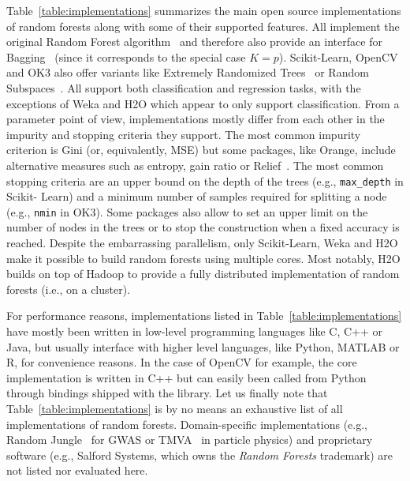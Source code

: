 Table~\ref{table:implementations} summarizes the main open source
implementations of random forests along with some of their supported features.
All implement the original Random Forest algorithm~\citep{breiman:2001} and
therefore also provide an interface for Bagging~\citep{breiman:1996b} (since it
corresponds to the special case $K=p$). Scikit-Learn, OpenCV and OK3 also offer
variants like Extremely Randomized Trees~\citep{geurts:2006} or Random
Subspaces~\citep{ho:1998}. All support both classification and regression
tasks, with the exceptions of Weka and H2O which appear to only support
classification. From a parameter point of view, implementations mostly differ
from each other in the impurity and stopping criteria they support. The most
common impurity criterion is Gini (or, equivalently, MSE) but some packages,
like Orange, include alternative measures such as entropy, gain
ratio or Relief~\citep{kira:1992}. The most common stopping criteria are an
upper bound on the depth of the trees (e.g., \texttt{max\_depth} in Scikit-
Learn) and a minimum number of samples required for splitting a node (e.g.,
\texttt{nmin} in OK3). Some packages also allow to set an upper limit on the
number of nodes in the trees or to stop the construction when a fixed accuracy
is reached. Despite the embarrassing parallelism, only Scikit-Learn, Weka and
H2O make it possible to build random forests using multiple cores. Most
notably, H2O builds on top of Hadoop to provide a fully distributed
implementation of random forests  (i.e., on a cluster).

For performance reasons, implementations listed in
Table~\ref{table:implementations} have mostly been written in low-level
programming languages like C, C++ or Java, but usually interface with higher
level languages, like Python, MATLAB or R, for convenience reasons. In the case
of OpenCV for example, the core implementation is written in C++ but can easily
been called from Python through bindings shipped with the library. Let us
finally note that Table~\ref{table:implementations} is by no means an
exhaustive list of all implementations of random forests. Domain-specific
implementations (e.g., Random Jungle~\citep{schwarz:2010} for GWAS or TMVA~\citep{hoecker:2007} in particle physics) and
proprietary software (e.g., Salford Systems, which owns the
\textit{Random Forests} trademark) are not listed nor evaluated here.

